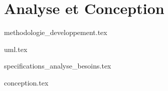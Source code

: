 \part{Analyse et Conception}
\parttoc %

%
{methodologie_developpement.tex}

% 
{uml.tex}

% 
{specifications_analyse_besoins.tex}


% 
{conception.tex}